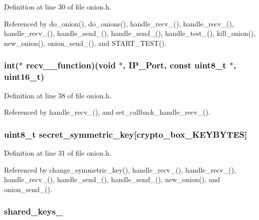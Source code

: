 Definition at line 30 of file onion.\+h.



Referenced by do\+\_\+onion(), do\+\_\+onions(), handle\+\_\+recv\+\_(), handle\+\_\+recv\+\_(), handle\+\_\+recv\+\_(), handle\+\_\+send\+\_(), handle\+\_\+send\+\_(), handle\+\_\+test\+\_(), kill\+\_\+onion(), new\+\_\+onion(), onion\+\_\+send\+\_(), and S\+T\+A\+R\+T\+\_\+\+T\+E\+S\+T().

\hypertarget{struct_onion_a980753d0df6688333680e95f637eb7a7}{
\subsubsection[{recv\+\_\+1\+\_\+function}]{\setlength{\rightskip}{0pt plus 5cm}int($\ast$ recv\+\_\+\_\+function)(void $\ast$, {\bf I\+P\+\_\+\+Port}, const uint8\+\_\+t $\ast$, uint16\+\_\+t)}}\label{struct_onion_a980753d0df6688333680e95f637eb7a7}


Definition at line 38 of file onion.\+h.



Referenced by handle\+\_\+recv\+\_(), and set\+\_\+callback\+\_\+handle\+\_\+recv\+\_().

\hypertarget{struct_onion_ab9f2ff47bc0b1e5110202a6e4be86390}{
\subsubsection[{secret\+\_\+symmetric\+\_\+key}]{\setlength{\rightskip}{0pt plus 5cm}uint8\+\_\+t secret\+\_\+symmetric\+\_\+key\mbox{[}{\bf crypto\+\_\+box\+\_\+\+K\+E\+Y\+B\+Y\+T\+E\+S}\mbox{]}}}\label{struct_onion_ab9f2ff47bc0b1e5110202a6e4be86390}


Definition at line 31 of file onion.\+h.



Referenced by change\+\_\+symmetric\+\_\+key(), handle\+\_\+recv\+\_(), handle\+\_\+recv\+\_(), handle\+\_\+recv\+\_(), handle\+\_\+send\+\_(), handle\+\_\+send\+\_(), new\+\_\+onion(), and onion\+\_\+send\+\_().

\hypertarget{struct_onion_a7dc1514173e0fd82d265ebc3a43090ea}{
\subsubsection[{shared\+\_\+keys\+\_\+1}]{ shared\+\_\+keys\+\_}}\label{struct_onion_a7dc1514173e0fd82d265ebc3a43090ea}



